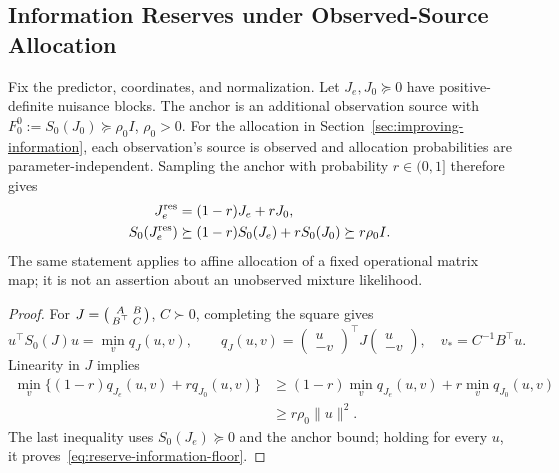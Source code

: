\subsection{Information Reserves under Observed-Source Allocation}
\label{app:information-reserves}
\label{sec:information-floors}

Fix the predictor, coordinates, and normalization. Let $J_e,J_0\succeq0$ have positive-definite nuisance blocks. The anchor is an additional observation source with $F_0^0:=S_0(J_0)\succeq\rho_0I$, $\rho_0>0$. For the allocation in Section~\ref{sec:improving-information}, each observation's source is observed and allocation probabilities are parameter-independent. Sampling the anchor with probability $r\in(0,1]$ therefore gives
\begin{equation}
\begin{aligned}
J_e^{\mathrm{res}}&=(1-r)J_e+rJ_0,\\
S_0(J_e^{\mathrm{res}})&\succeq(1-r)S_0(J_e)+rS_0(J_0)\succeq r\rho_0I.
\end{aligned}
\label{eq:reserve-information-floor}
\end{equation}
The same statement applies to affine allocation of a fixed operational matrix map; it is not an assertion about an unobserved mixture likelihood.

\begin{proof}
For $J=\begin{psmallmatrix}A&B\\B^\top&C\end{psmallmatrix}$, $C\succ0$, completing the square gives
\begin{equation}
u^\top S_0(J)u=\min_v q_J(u,v),\qquad
q_J(u,v)=\begin{pmatrix}u\\-v\end{pmatrix}^{\!\top}J\begin{pmatrix}u\\-v\end{pmatrix},
\quad v_* = C^{-1}B^\top u.
\label{eq:reserve-schur-variational}
\end{equation}
Linearity in $J$ implies
\begin{equation}
\begin{aligned}
\min_v\{(1-r)q_{J_e}(u,v)+rq_{J_0}(u,v)\}
&\ge(1-r)\min_vq_{J_e}(u,v)+r\min_vq_{J_0}(u,v)\\
&\ge r\rho_0\lVert u\rVert^2.
\end{aligned}
\label{eq:reserve-schur-concavity}
\end{equation}
The last inequality uses $S_0(J_e)\succeq0$ and the anchor bound; holding for every $u$, it proves~\eqref{eq:reserve-information-floor}.
\end{proof}

